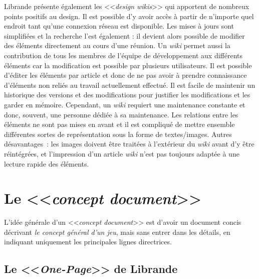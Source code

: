 
Librande présente également les <<\emph{design wikis}>> qui apportent de nombreux points positifs au design.
Il est possible d'y avoir accès à partir de n'importe quel endroit tant qu'une connexion réseau est disponible.
Les mises à jours sont simplifiées et la recherche l'est également : il devient alors possible de modifier des éléments directement au cours d'une réunion.
Un \emph{wiki} permet aussi la contribution de tous les membres de l'équipe de développement aux différents éléments car la modification est possible par plusieurs utilisateurs.
Il est possible d'éditer les éléments par article et donc de ne pas avoir à prendre connaissance d'éléments non reliés au travail actuellement effectué.
Il est facile de maintenir un historique des versions et des modifications pour justifier les modifications et les garder en mémoire.
Cependant, un \emph{wiki} requiert une maintenance constante et donc, souvent, une personne dédiée à sa maintenance.
Les relations entre les éléments ne sont pas mises en avant et il est compliqué de mettre ensemble différentes sortes de représentation sous la forme de textes/images.
Autres d\'esavantages~: les images doivent être traitées à l'extérieur du \emph{wiki} avant d'y être réintégrées, et l'impression d'un article \emph{wiki} n'est pas toujours adaptée à une lecture rapide des éléments.\\



\section{Le <<\emph{concept document}>>}

L'id\'ee g\'en\'erale d'un <<\emph{concept document}>> est
d'avoir un document concis décrivant \emph{le concept général d'un
jeu}, mais sans entrer dans les détails, en indiquant uniquement les
principales lignes directrices.


\subsection{Le <<\emph{One-Page}>> de Librande}

